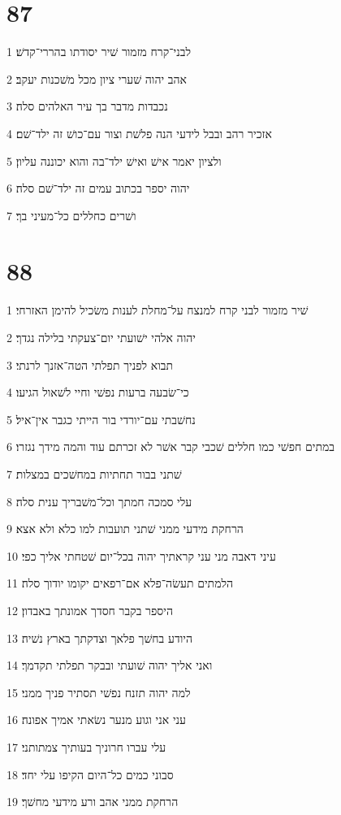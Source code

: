 \chapter{87}

\par 1 לבני־קרח מזמור שׁיר יסודתו בהררי־קדשׁ׃
\par 2 אהב יהוה שׁערי ציון מכל משׁכנות יעקב׃
\par 3 נכבדות מדבר בך עיר האלהים סלה׃
\par 4 אזכיר רהב ובבל לידעי הנה פלשׁת וצור עם־כושׁ זה ילד־שׁם׃
\par 5 ולציון יאמר אישׁ ואישׁ ילד־בה והוא יכוננה עליון׃
\par 6 יהוה יספר בכתוב עמים זה ילד־שׁם סלה׃
\par 7 ושׁרים כחללים כל־מעיני בך׃

\chapter{88}

\par 1 שׁיר מזמור לבני קרח למנצח על־מחלת לענות משׂכיל להימן האזרחי׃
\par 2 יהוה אלהי ישׁועתי יום־צעקתי בלילה נגדך׃
\par 3 תבוא לפניך תפלתי הטה־אזנך לרנתי׃
\par 4 כי־שׂבעה ברעות נפשׁי וחיי לשׁאול הגיעו׃
\par 5 נחשׁבתי עם־יורדי בור הייתי כגבר אין־איל׃
\par 6 במתים חפשׁי כמו חללים שׁכבי קבר אשׁר לא זכרתם עוד והמה מידך נגזרו׃
\par 7 שׁתני בבור תחתיות במחשׁכים במצלות׃
\par 8 עלי סמכה חמתך וכל־משׁבריך ענית סלה׃
\par 9 הרחקת מידעי ממני שׁתני תועבות למו כלא ולא אצא׃
\par 10 עיני דאבה מני עני קראתיך יהוה בכל־יום שׁטחתי אליך כפי׃
\par 11 הלמתים תעשׂה־פלא אם־רפאים יקומו יודוך סלה׃
\par 12 היספר בקבר חסדך אמונתך באבדון׃
\par 13 היודע בחשׁך פלאך וצדקתך בארץ נשׁיה׃
\par 14 ואני אליך יהוה שׁועתי ובבקר תפלתי תקדמך׃
\par 15 למה יהוה תזנח נפשׁי תסתיר פניך ממני׃
\par 16 עני אני וגוע מנער נשׂאתי אמיך אפונה׃
\par 17 עלי עברו חרוניך בעותיך צמתותני׃
\par 18 סבוני כמים כל־היום הקיפו עלי יחד׃
\par 19 הרחקת ממני אהב ורע מידעי מחשׁך׃

